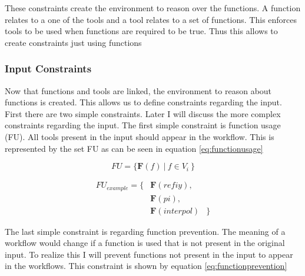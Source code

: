 \documentclass{article}
\begin{document}
These constraints create the environment to reason over the functions. A function relates to a one of the tools and a tool relates to a set of functions. This enforces tools to be used when functions are required to be true. Thus this allows to create constraints just using functions

\subsubsection{Input Constraints}


Now that functions and tools are linked, the environment to reason about functions is created. This allows us to define constraints regarding the input. First there are two simple constraints. Later I will discuss the more complex constraints regarding the input. The first simple constraint is function usage (FU). All tools present in the input should appear in the workflow. This is represented by the set FU as can be seen in equation \ref{eq:functionusage}


\begin{equation}
    FU = \{ \textbf{F}(f)\ |\ f \in V_i\ \}
    \label{eq:functionusage}
\end{equation}

\begin{align*}
    FU_{example}=\{& \textbf{F}(refiy), \\
    &\textbf{F}(pi), \\
    & \textbf{F}(interpol)& \}
\end{align*}

The last simple constraint is regarding function prevention. The meaning of a workflow would change if a function is used that is not present in the original input. To realize this I will prevent functions not present in the input to appear in the workflows. This constraint is shown by equation \ref{eq:functionprevention}
\end{document}
